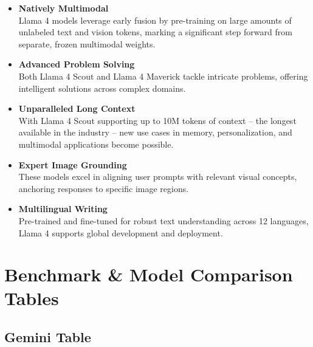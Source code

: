 \documentclass{article}
\begin{document}
\begin{itemize}
    \item \textbf{Natively Multimodal} \\
          Llama 4 models leverage early fusion by pre-training on large amounts of unlabeled text and vision tokens, marking a significant step forward from separate, frozen multimodal weights.

    \item \textbf{Advanced Problem Solving} \\
          Both Llama 4 Scout and Llama 4 Maverick tackle intricate problems, offering intelligent solutions across complex domains.

    \item \textbf{Unparalleled Long Context} \\
          With Llama 4 Scout supporting up to 10M tokens of context -- the longest available in the industry -- new use cases in memory, personalization, and multimodal applications become possible.

    \item \textbf{Expert Image Grounding} \\
          These models excel in aligning user prompts with relevant visual concepts, anchoring responses to specific image regions.

    \item \textbf{Multilingual Writing} \\
          Pre-trained and fine-tuned for robust text understanding across 12 languages, Llama 4 supports global development and deployment.
\end{itemize}

\bigskip

\section*{Benchmark \& Model Comparison Tables}

\subsection*{Gemini Table}
\end{document}
